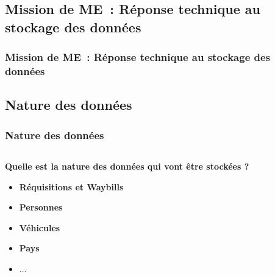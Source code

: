 \subsection{Mission de ME~: Réponse technique au stockage des données}
\begin{frame}
	\frametitle{Mission de ME~: Réponse technique au stockage des données}
\end{frame}



\subsection[Nature des données]{Nature des données}
\begin{frame}
\frametitle{Nature des données}
\begin{columns}[c]
\begin{column}{12cm}
\begin{block}{\textbf{Quelle est la nature des données qui vont être stockées ?}}
\begin{itemize}
\item<2-> \textbf{Réquisitions et Waybills}
\item<3-> \textbf{Personnes}
\item<4-> \textbf{Véhicules}
\item<5-> \textbf{Pays}
\item<6-> ...
\end{itemize}
\end{block}
\end{column}
\end{columns}
\end{frame}

